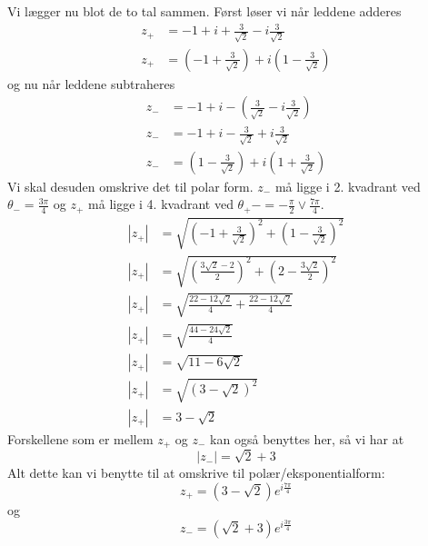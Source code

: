 \documentclass{report}
\begin{document}
Vi lægger nu blot de to tal sammen. Først løser vi når leddene adderes\begin{align*}
    z_+&=-1+i+\frac{3}{\sqrt{2}}-i\frac{3}{\sqrt{2}}\\
    z_+&=\left(-1+\frac{3}{\sqrt{2}}\right)+i\left(1-\frac{3}{\sqrt{2}}\right)
\end{align*}
og nu når leddene subtraheres
\begin{align*}
    z_-&=-1+i-\left(\frac{3}{\sqrt{2}}-i\frac{3}{\sqrt{2}}\right)\\
    z_-&=-1+i-\frac{3}{\sqrt{2}}+i\frac{3}{\sqrt{2}}\\
    z_-&=\left(1-\frac{3}{\sqrt{2}}\right)+i\left(1+\frac{3}{\sqrt{2}}\right)
\end{align*}
Vi skal desuden omskrive det til polar form. $z_-$ må ligge i 2. kvadrant ved $\theta_-=\frac{3\pi}{4}$ og $z_+$ må ligge i 4. kvadrant ved $\theta_+-=-\frac{\pi}{2}\lor\frac{7\pi}{4}$. \begin{align*}
    |z_+|&=\sqrt{\left(-1+\frac{3}{\sqrt{2}}\right)^2+\left(1-\frac{3}{\sqrt{2}}\right)^2}\\
    |z_+|&=\sqrt{\left(\frac{3\sqrt{2}-2}{2}\right)^2+\left(2-\frac{3\sqrt{2}}{2}\right)^2}\\
    |z_+|&=\sqrt{\frac{22-12\sqrt{2}}{4}+\frac{22-12\sqrt{2}}{4}}\\
    |z_+|&=\sqrt{\frac{44-24\sqrt{2}}{4}}\\
    |z_+|&=\sqrt{11-6\sqrt{2}}\\
    |z_+|&=\sqrt{\left(3-\sqrt{2}\right)^2}\\
    |z_+|&=3-\sqrt{2}
\end{align*}
Forskellene som er mellem $z_+$ og $z_-$ kan også benyttes her, så vi har at$$|z_-|=\sqrt{2}+3$$
Alt dette kan vi benytte til at omskrive til polær/eksponentialform:\begin{equation}
    z_+=(3-\sqrt{2})e^{i\frac{7\pi}{4}}
\end{equation}og\begin{equation}
    z_-=(\sqrt{2}+3)e^{i\frac{3\pi}{4}}
\end{equation}
\end{document}
